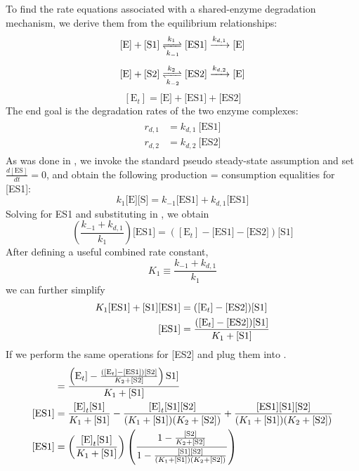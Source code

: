 To find the rate equations associated with a shared-enzyme degradation mechanism, we derive them from the equilibrium relationships:
\begin{equation*}
  \text{[E]} + \text{[S1]} \xrightleftharpoons[k_{-1}]{k_1} \text{[ES1]} \xrightarrow{k_{d,1}} \text{[E]}
\end{equation*}
\begin{equation*}
  \text{[E]} + \text{[S2]} \xrightleftharpoons[k_{-2}]{k_2}  \text{[ES2]} \xrightarrow{k_{d,2}} \text{[E]}
\end{equation*}
\begin{equation} \label{eq:totE}
  [\text{E}_t] = \text{[E]} + \text{[ES1]} + \text{[ES2]}
\end{equation}
The end goal is the degradation rates of the two enzyme complexes:
\begin{align}
  \begin{split}\label{eq:r1}
    r_{d,1} &= k_{d,1} \ \text{[ES1]}\\
    r_{d,2} &= k_{d,2} \ \text{[ES2]}
  \end{split}
\end{align}
As was done in , we invoke the standard pseudo steady-state assumption and set $\frac{d[\text{ES}]}{dt}=0$, and obtain the following production = consumption equalities for [ES1]:
\begin{equation} \label{eq:pss}
  k_1\text{[E]}\text{[S]} = k_{-1}\text{[ES1]} + k_{d,1}\text{[ES1]}
\end{equation}
Solving  for ES1 and substituting in , we obtain
\begin{equation*}
  \left(\frac{k_{-1}+k_{d,1}}{k_1}\right)\text{[ES1]} = \left([\text{E}_t] - \text{[ES1]} - \text{[ES2]}\right)\text{[S1]}
\end{equation*}
After defining a useful combined rate constant,
\begin{equation*}
  K_1 \equiv \frac{k_{-1}+k_{d,1}}{k_1}
\end{equation*}
we can further simplify
\begin{align}
  K_1 \text{[ES1]} + \text{[S1]}\text{[ES1]} &= ([\text{E}_t] - [\text{ES2}])[\text{S1}] \notag\\
  [\text{ES1}] &= \frac{([\text{E}_t] - [\text{ES2}])[\text{S1}]}{K_1 + [\text{S1}]} \label{eq:eqabove}
\end{align}
If we perform the same operations for [ES2] and plug them into .
\begin{align}
  [\text{ES1}] &= \frac{\left(\text{E}_t] - \frac{([\text{E}_t] - [\text{ES1}])[\text{S2}]}{K_2 + [\text{S2}]}\right)\text{S1}]}{K_1 + [\text{S1}]} \notag\\
  [\text{ES1}] &= \frac{\text{[E]}_t \text{[S1]}}{K_1 + \text{[S1]}} - \frac{\text{[E]}_t \text{[S1]} \text{[S2]}}{(K_1 + \text{[S1]}) (K_2 + \text{[S2]})} + \frac{\text{[ES1]} \text{[S1]} \text{[S2]}}{(K_1 + \text{[S1]}) (K_2 + \text{[S2]})} \notag\\
  \label{eq:twofracs}
  [\text{ES1}] &= \left(\frac{\text{[E]}_t \text{[S1]}}{K_1 + \text{[S1]}}\right) \left(\frac{1 - \frac{\text{[S2]}}{K_2 + \text{[S2]}}}{1 - \frac{\text{[S1]} \text{[S2]}}{(K_1 + \text{[S1]}) (K_2 + \text{[S2]})}}\right)
\end{align}
